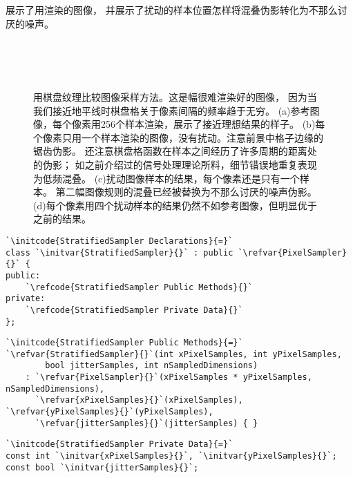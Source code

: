 展示了用渲染的图像，
并展示了扰动的样本位置怎样将混叠伪影转化为不那么讨厌的噪声。
\begin{figure}[htbp]
    \centering
    \\
    \\
    \\
    \caption{用棋盘纹理比较图像采样方法。这是幅很难渲染好的图像，
    因为当我们接近地平线时棋盘格关于像素间隔的频率趋于无穷。
    (a)参考图像，每个像素用256个样本渲染，展示了接近理想结果的样子。
    (b)每个像素只用一个样本渲染的图像，没有扰动。注意前景中格子边缘的锯齿伪影。
    还注意棋盘格函数在样本之间经历了许多周期的距离处的伪影；
    如之前介绍过的信号处理理论所料，细节错误地重复表现为低频混叠。
    (c)扰动图像样本的结果，每个像素还是只有一个样本。
    第二幅图像规则的混叠已经被替换为不那么讨厌的噪声伪影。
    (d)每个像素用四个扰动样本的结果仍然不如参考图像，但明显优于之前的结果。}
    \label{fig:7.19}
\end{figure}

\begin{lstlisting}
`\initcode{StratifiedSampler Declarations}{=}`
class `\initvar{StratifiedSampler}{}` : public `\refvar{PixelSampler}{}` {
public:
    `\refcode{StratifiedSampler Public Methods}{}`
private:
    `\refcode{StratifiedSampler Private Data}{}`
};
\end{lstlisting}
\begin{lstlisting}
`\initcode{StratifiedSampler Public Methods}{=}`
`\refvar{StratifiedSampler}{}`(int xPixelSamples, int yPixelSamples,
        bool jitterSamples, int nSampledDimensions)
    : `\refvar{PixelSampler}{}`(xPixelSamples * yPixelSamples, nSampledDimensions),
      `\refvar{xPixelSamples}{}`(xPixelSamples), `\refvar{yPixelSamples}{}`(yPixelSamples),
      `\refvar{jitterSamples}{}`(jitterSamples) { }
\end{lstlisting}
\begin{lstlisting}
`\initcode{StratifiedSampler Private Data}{=}`
const int `\initvar{xPixelSamples}{}`, `\initvar{yPixelSamples}{}`;
const bool `\initvar{jitterSamples}{}`;
\end{lstlisting}


